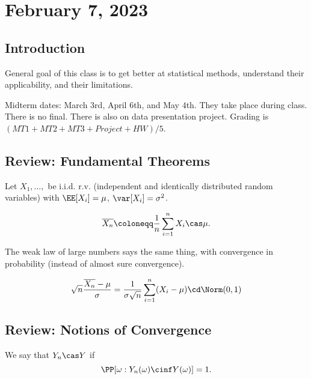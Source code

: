 \section{February 7, 2023}

\subsection{Introduction}

General goal of this class is to get better at statistical methods, understand their applicability, and their limitations. 

Midterm dates: March $3$rd, April $6$th, and May $4$th. They take place during class. There is no final. There is also on data presentation project. Grading is $(MT1+MT2+MT3+Project+HW)/5$. 

\subsection{Review: Fundamental Theorems}

Let $X_1, \hdots,$ be i.i.d. r.v. (independent and identically distributed random variables) with $\EE[X_i] = \mu$, $\var[X_i] = \sigma^2$. 

\begin{theorem}

\[\overline{X_n} \coloneqq \frac{1}{n}\sum_{i=1}^n X_i \cas \mu.\]
\end{theorem}

The weak law of large numbers says the same thing, with convergence in probability (instead of almost sure convergence). 

\begin{theorem}

\[\sqrt{n}\frac{\overline{X_n} - \mu}{\sigma} = \frac{1}{\sigma \sqrt{n}}\sum_{i=1}^n(X_i - \mu)\cd \Norm(0,1)\]
\end{theorem}

\subsection{Review: Notions of Convergence}

\begin{definition}

We say that $Y_n\cas Y$ if 
\[\PP[\omega : Y_n(\omega) \cinf Y(\omega)] = 1.\]
\end{definition}

